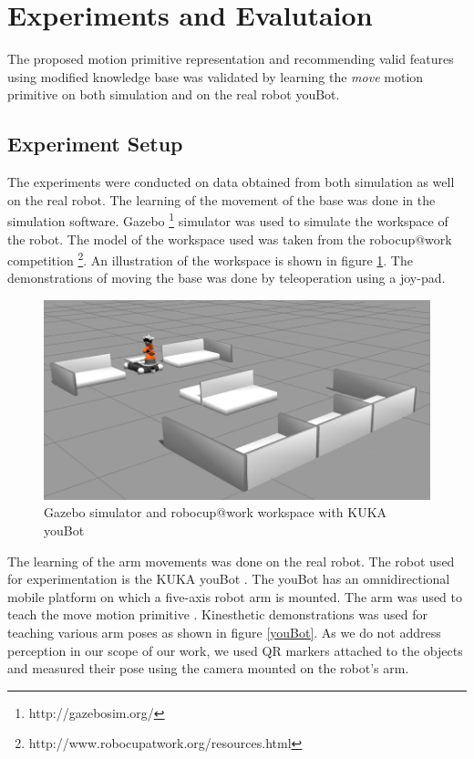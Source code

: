 \section{Experiments and Evalutaion}
The proposed motion primitive representation and recommending valid features using modified
knowledge base was validated by learning the \textit{move} motion primitive
on both simulation and on the real robot youBot.

\subsection{Experiment Setup}

The experiments were conducted on data obtained from both simulation as well on
the real robot. The learning of the movement of the base was done in the
simulation software. Gazebo \footnote{http://gazebosim.org/} simulator was used
to simulate the workspace of the robot. The model of the workspace used was
taken from the robocup@work competition
\footnote{http://www.robocupatwork.org/resources.html}. An illustration of the
workspace is shown in figure \ref{gazebo}. The demonstrations of moving the base was done by
teleoperation using a joy-pad.

\begin{figure}[htp]
\centering
\includegraphics[scale=0.5]{images/gazebo_arena.jpg}
\caption{Gazebo simulator and robocup@work workspace with KUKA youBot}
\label{gazebo}
\end{figure}

The learning of the arm movements was done on the real robot. The robot used
for experimentation is the KUKA youBot \footnotemark.
The youBot has an omnidirectional mobile platform on which a five-axis robot
arm is mounted. The arm was used to teach the move motion primitive .
Kinesthetic demonstrations was used for teaching various arm poses as shown in figure \ref{youBot}.
As we do not address perception in our scope of our work, we used QR markers attached to the objects 
and measured their pose using the camera mounted on the robot's arm.

